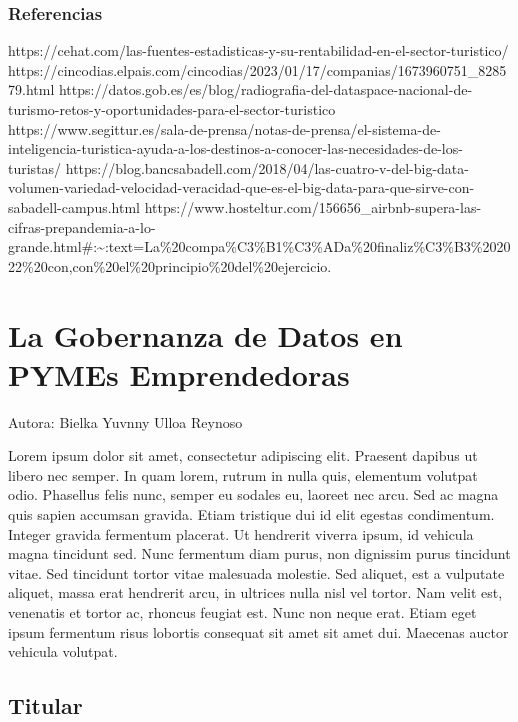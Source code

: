 \documentclass[
  letterpaper,
  DIV=11,
  numbers=noendperiod]{scrreprt}
\begin{document}
\hypertarget{referencias}{%
\subsection{Referencias}\label{referencias}}

https://cehat.com/las-fuentes-estadisticas-y-su-rentabilidad-en-el-sector-turistico/
https://cincodias.elpais.com/cincodias/2023/01/17/companias/1673960751\_828579.html
https://datos.gob.es/es/blog/radiografia-del-dataspace-nacional-de-turismo-retos-y-oportunidades-para-el-sector-turistico
https://www.segittur.es/sala-de-prensa/notas-de-prensa/el-sistema-de-inteligencia-turistica-ayuda-a-los-destinos-a-conocer-las-necesidades-de-los-turistas/
https://blog.bancsabadell.com/2018/04/las-cuatro-v-del-big-data-volumen-variedad-velocidad-veracidad-que-es-el-big-data-para-que-sirve-con-sabadell-campus.html
https://www.hosteltur.com/156656\_airbnb-supera-las-cifras-prepandemia-a-lo-grande.html\#:\textasciitilde:text=La\%20compa\%C3\%B1\%C3\%ADa\%20finaliz\%C3\%B3\%202022\%20con,con\%20el\%20principio\%20del\%20ejercicio.


\hypertarget{la-gobernanza-de-datos-en-pymes-emprendedoras}{%
\chapter{La Gobernanza de Datos en PYMEs
Emprendedoras}\label{la-gobernanza-de-datos-en-pymes-emprendedoras}}

Autora: Bielka Yuvnny Ulloa Reynoso

Lorem ipsum dolor sit amet, consectetur adipiscing elit. Praesent
dapibus ut libero nec semper. In quam lorem, rutrum in nulla quis,
elementum volutpat odio. Phasellus felis nunc, semper eu sodales eu,
laoreet nec arcu. Sed ac magna quis sapien accumsan gravida. Etiam
tristique dui id elit egestas condimentum. Integer gravida fermentum
placerat. Ut hendrerit viverra ipsum, id vehicula magna tincidunt sed.
Nunc fermentum diam purus, non dignissim purus tincidunt vitae. Sed
tincidunt tortor vitae malesuada molestie. Sed aliquet, est a vulputate
aliquet, massa erat hendrerit arcu, in ultrices nulla nisl vel tortor.
Nam velit est, venenatis et tortor ac, rhoncus feugiat est. Nunc non
neque erat. Etiam eget ipsum fermentum risus lobortis consequat sit amet
sit amet dui. Maecenas auctor vehicula volutpat.

\hypertarget{titular-16}{%
\section{Titular}\label{titular-16}}
\end{document}
